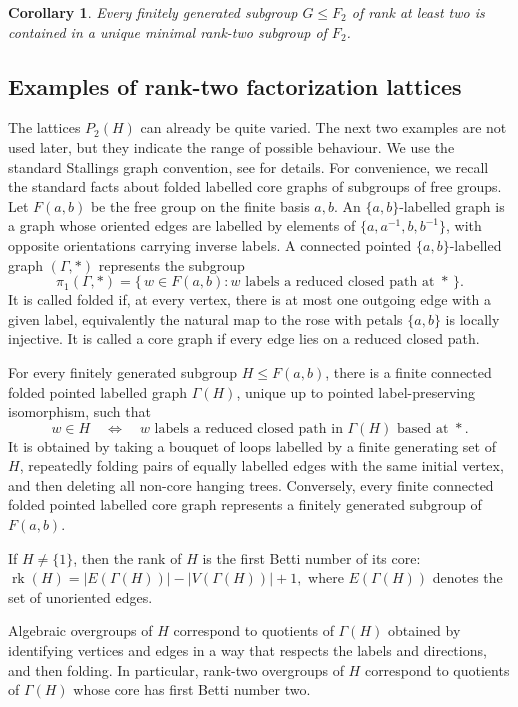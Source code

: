 \documentclass{amsproc}
\newtheorem{corollary}[theorem]{Corollary}
\begin{document}
\begin{corollary}
Every finitely generated subgroup $G\leq F_2$ of rank at least two is
contained in a unique minimal rank-two subgroup of $F_2$.
\end{corollary}

\subsection{Examples of rank-two factorization lattices}
\label{sec:examples}

The lattices $P_2(H)$ can already be quite varied.  The next two examples are
not used later, but they indicate the range of possible behaviour. We use the standard Stallings graph convention, see \cite{Stallings} for details. 
For convenience, we recall the standard facts about folded labelled core graphs of subgroups of
free groups. Let \(F(a,b)\) be the free group on the finite basis \(a,b\). An
\(\{a,b\}\)-labelled graph is a graph whose oriented edges are labelled by elements of
\(\{a,a^{-1},b,b^{-1}\}\), with opposite orientations carrying inverse labels. A connected
pointed \(\{a,b\}\)-labelled graph \((\Gamma,*)\) represents the subgroup
\[
\pi_1(\Gamma,*)=\{\,w\in F(a,b): w \text{ labels a reduced closed path at } *\,\}.
\]
It is called folded if, at every vertex, there is at most one outgoing edge with
a given label, equivalently the natural map to the rose with petals \(\{a,b\}\) is
locally injective. It is called a core graph if every edge lies on a reduced
closed path.

For every finitely generated subgroup \(H\leq F(a,b)\), there is a finite
connected folded pointed labelled graph \(\Gamma(H)\), unique up to pointed
label-preserving isomorphism, such that
\[
w\in H
\quad\Longleftrightarrow\quad
w \text{ labels a reduced closed path in } \Gamma(H) \text{ based at } * .
\]
It is obtained by taking a bouquet of loops labelled by a finite generating set
of \(H\), repeatedly folding pairs of equally labelled edges with the same
initial vertex, and then deleting all non-core hanging trees. Conversely, every
finite connected folded pointed labelled core graph represents a finitely
generated subgroup of \(F(a,b)\).

If \(H\neq \{1\}\), then the rank of \(H\) is the first Betti number of its core:
$
\operatorname{rk}(H)=|E(\Gamma(H))|-|V(\Gamma(H))|+1,
$
where \(E(\Gamma(H))\) denotes the set of unoriented edges.

Algebraic overgroups of \(H\) correspond to quotients of \(\Gamma(H)\) obtained by identifying vertices and edges in a way that respects the labels and directions, and then folding.  In particular, rank-two overgroups of \(H\) correspond to quotients of \(\Gamma(H)\) whose core has first Betti number two.
\end{document}
